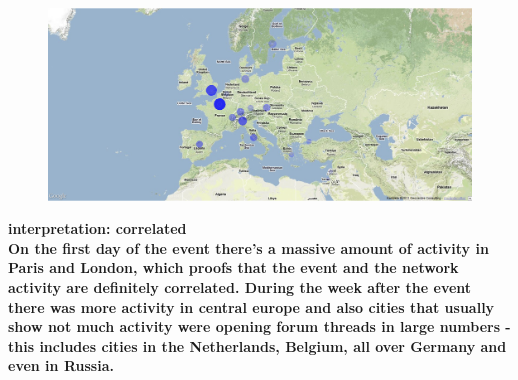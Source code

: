 \documentclass[11pt,a4paper,english]{article}
\begin{document}
\begin{itemize}
\begin{figure}[H]
\begin{center}
							\includegraphics[width=130mm]{img/post-london}
						\end{center}					
						\vspace{-13pt}
					\end{figure}
					
					\bf interpretation: \rm correlated
					\\ On the first day of the event there's a massive amount of activity in Paris and London, which proofs that the event and the network activity are definitely correlated. During the week after the event there was more activity in central europe and also cities that usually show not much activity were opening forum threads in large numbers - this includes cities in the Netherlands, Belgium, all over Germany and even in Russia.


\end{itemize}
\end{document}
